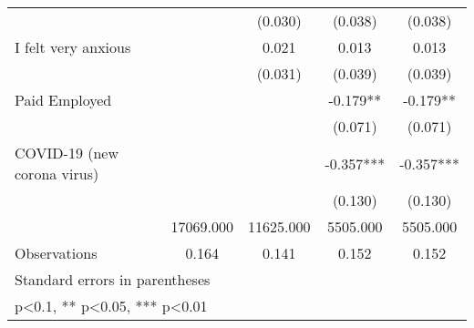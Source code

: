 {\begin{tabular}{l*{4}{c}}
                &            &  (0.030)   &  (0.038)   &  (0.038)   \\
[1em]
I felt very anxious&            &    0.021   &    0.013   &    0.013   \\
                &            &  (0.031)   &  (0.039)   &  (0.039)   \\
[1em]
Paid Employed   &            &            &   -0.179** &   -0.179** \\
                &            &            &  (0.071)   &  (0.071)   \\
[1em]
COVID-19 (new corona virus)&            &            &   -0.357***&   -0.357***\\
                &            &            &  (0.130)   &  (0.130)   \\
\hline
\hspace{2mm}    &17069.000   &11625.000   & 5505.000   & 5505.000   \\
Observations    &    0.164   &    0.141   &    0.152   &    0.152   \\
\hline\hline
\multicolumn{5}{l}{\footnotesize Standard errors in parentheses}\\
\multicolumn{5}{l}{\footnotesize * p<0.1, ** p<0.05, *** p<0.01}\\
\end{tabular}
}
